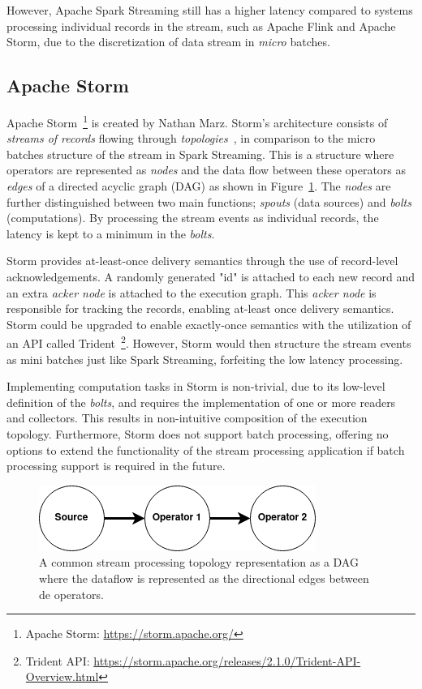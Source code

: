 However, Apache Spark Streaming still has a 
higher latency compared to systems processing individual records in the stream, 
such as Apache Flink and Apache Storm, due to the discretization of 
data stream in \emph{micro} batches. 


\subsection{Apache Storm}%
\label{sub:Apache Storm}

Apache Storm~\footnote{Apache Storm: \url{https://storm.apache.org/}} is 
created by Nathan Marz.
Storm's architecture 
consists of \emph{streams of records} flowing through
\emph{topologies}~\cite{storm_twitter}, in comparison to 
the micro batches structure of the stream in Spark Streaming. 
This is a structure where operators are 
represented as \emph{nodes} and the data flow between these operators as \emph{edges} of 
a directed acyclic graph (DAG) as shown in Figure~\ref{fig:dag_topology}. 
The \emph{nodes} are further distinguished between 
two main functions; \emph{spouts} (data sources) and \emph{bolts} (computations).  
By processing the stream events as individual records, the latency is kept 
to a minimum in the \emph{bolts}. 

Storm provides at-least-once 
delivery semantics through the use of record-level acknowledgements. A randomly 
generated "id" is attached to each new record and an extra \emph{acker node} is attached 
to the execution graph. This \emph{acker node} is responsible for tracking the records, 
enabling at-least once delivery semantics. Storm could be upgraded to enable 
exactly-once semantics with the utilization of an API called
Trident~\footnote{Trident API: \url{https://storm.apache.org/releases/2.1.0/Trident-API-Overview.html}}. 
However, Storm would then structure the stream events as mini batches just like 
Spark Streaming, forfeiting the low latency processing. 

Implementing computation tasks 
in Storm is non-trivial, due to its low-level definition of the \emph{bolts}, 
and requires the implementation of one or more readers and 
collectors. This results in non-intuitive composition of the execution topology. 
Furthermore, Storm does not support 
batch processing, offering no options to extend the functionality of the stream 
processing application if batch processing support is required in the future. 


\begin{figure}[!htpb]
    \centering
    \includegraphics[width=0.5\linewidth]{fig/dag.png}
    \caption{A common stream processing topology representation as a DAG where the 
    dataflow is represented as the directional edges between de operators.} 
    \label{fig:dag_topology}
\end{figure}

